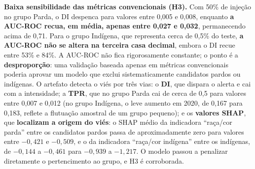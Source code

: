 \textbf{Baixa sensibilidade das métricas convencionais (H3).} Com 50\% de injeção no grupo Parda, o DI despenca para valores entre 0,005 e 0,008, enquanto \textbf{a AUC-ROC recua, em média, apenas entre 0,027 e 0,032}, permanecendo acima de 0,71. Para o grupo Indígena, que representa cerca de 0,5\% do teste, \textbf{a AUC-ROC não se altera na terceira casa decimal}, embora o DI recue entre 53\% e 84\%. A AUC-ROC não fica rigorosamente constante; o ponto é a \textbf{desproporção}: uma validação baseada apenas em métricas convencionais poderia aprovar um modelo que exclui sistematicamente candidatos pardos ou indígenas. O artefato detecta o viés por três vias: o \textbf{DI}, que dispara o alerta e cai com a intensidade; a \textbf{TPR}, que no grupo Parda cai de cerca de 0,5 para valores entre 0,007 e 0,012 (no grupo Indígena, o leve aumento em 2020, de 0,167 para 0,183, reflete a flutuação amostral de um grupo pequeno); e os \textbf{valores SHAP}, que \textbf{localizam a origem do viés}: o SHAP médio da indicadora ``raça/cor parda'' entre os candidatos pardos passa de aproximadamente zero para valores entre $-0{,}421$ e $-0{,}509$, e o da indicadora ``raça/cor indígena'' entre os indígenas, de $-0{,}144$ a $-0{,}461$ para $-0{,}939$ a $-1{,}217$. O modelo passou a penalizar diretamente o pertencimento ao grupo, e H3 é corroborada.

